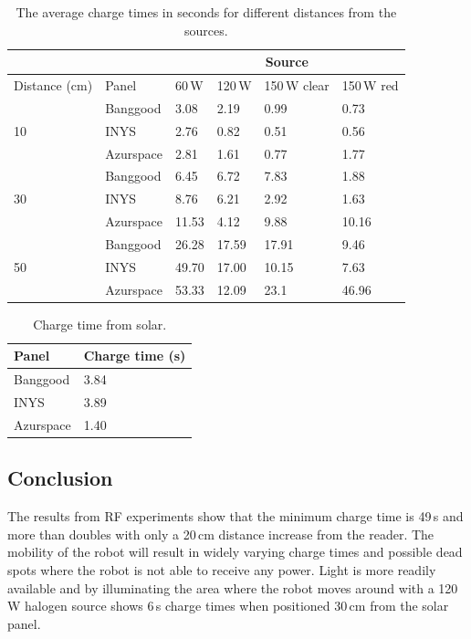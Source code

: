 \begin{table}[t]
	\centering
	\caption{The average charge times in seconds for different distances from the sources.}
	\label{tab:light_results}
	\begin{tabular}{|l|l||l|l|l|l|}
		\hline
		\multicolumn{2}{|c|}{} & \multicolumn{4}{|c|}{Source} \\
		\hline
		Distance (cm) & Panel & 60\,W & 120\,W & 150\,W clear & 150\,W red \\
		\hline \hline
		\multirow{3}{*}{10} & Banggood & 3.08 & 2.19 & 0.99 & 0.73 \\
		& INYS & 2.76 & 0.82 & 0.51 & 0.56 \\
		& Azurspace & 2.81 & 1.61 & 0.77 & 1.77 \\
		\hline
		\multirow{3}{*}{30} & Banggood & 6.45 & 6.72 & 7.83 & 1.88 \\
		& INYS & 8.76 & 6.21 & 2.92 & 1.63 \\
		& Azurspace& 11.53 & 4.12 & 9.88 & 10.16\\
		\hline
		\multirow{3}{*}{50} & Banggood & 26.28 & 17.59 & 17.91 & 9.46 \\
		& INYS & 49.70 & 17.00 & 10.15 & 7.63 \\
		& Azurspace & 53.33 & 12.09 & 23.1 & 46.96 \\
		\hline
	\end{tabular}
\end{table}

\begin{table}[t]
	\centering
	\caption{Charge time from solar.}
	\label{tab:solar_results}
	\begin{tabular}{|l|l|}
		\hline
		Panel & Charge time (s) \\
		\hline \hline
		Banggood & 3.84\\
		INYS & 3.89\\ 
		Azurspace & 1.40\\
		\hline
	\end{tabular}
\end{table}

\subsection{Conclusion}

The results from RF experiments show that the minimum charge time is 49\,s and more than doubles with only a 20\,cm distance increase from the reader.
The mobility of the robot will result in widely varying charge times and possible dead spots where the robot is not able to receive any power.
Light is more readily available and by illuminating the area where the robot moves around with a 120\,W halogen source shows 6\,s charge times when positioned 30\,cm from the solar panel.

